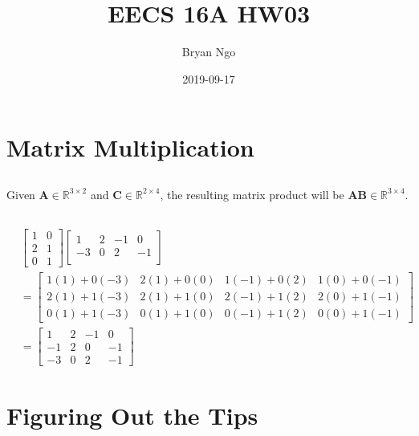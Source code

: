 \documentclass[]{article}
\title{EECS 16A HW03}
\author{Bryan Ngo}
\date{2019-09-17}
\begin{document}
\maketitle

\section{Matrix Multiplication}

\subsection{}

Given \(\mathbf{A} \in \mathbb{R}^{3 \times 2}\) and \(\mathbf{C} \in \mathbb{R}^{2 \times 4}\), the resulting matrix product will be \(\mathbf{AB} \in \mathbb{R}^{3 \times 4}\). 

\subsection{}

\begin{align}
	&\begin{bmatrix}
	1 & 0 \\
	2 & 1 \\
	0 & 1
	\end{bmatrix}
	\begin{bmatrix}
	1 & 2 & -1 & 0 \\
	-3 & 0 & 2 & -1 \\
	\end{bmatrix} \\
	&= \begin{bmatrix}
	1(1) + 0(-3) & 2(1) + 0(0) & 1(-1) + 0(2) & 1(0) + 0(-1) \\
	2(1) + 1(-3) & 2(1) + 1(0) & 2(-1) + 1(2) & 2(0) + 1(-1) \\
	0(1) + 1(-3) & 0(1) + 1(0) & 0(-1) + 1(2) & 0(0) + 1(-1)
	\end{bmatrix} \\
	&= \begin{bmatrix}
	1 & 2 & -1 & 0 \\
	-1 & 2 & 0 & -1 \\
	-3 & 0 & 2 & -1
	\end{bmatrix}
\end{align}

\section{Figuring Out the Tips}
\end{document}
